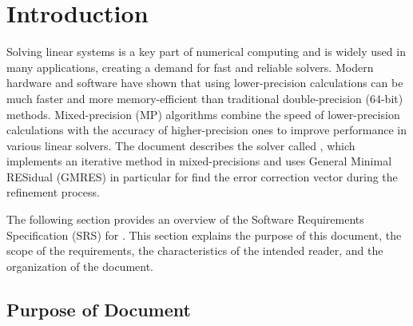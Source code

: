 \documentclass[12pt]{article}
\begin{document}





\section{Introduction}

Solving linear systems is a key part of numerical computing and is widely used
in many applications, creating a demand for fast and reliable solvers. Modern
hardware and software have shown that using lower-precision calculations can be
much faster and more memory-efficient than traditional double-precision (64-bit)
methods. Mixed-precision (MP) algorithms combine the speed of lower-precision
calculations with the accuracy of higher-precision ones to improve performance
in various linear solvers. The document describes the solver called \progname,
which implements an iterative method in mixed-precisions and uses General
Minimal RESidual (GMRES) in particular for find the error correction vector
during the refinement process.

The following section provides an overview of the Software Requirements
Specification (SRS) for \progname. This section explains the purpose of this
document, the scope of the requirements, the characteristics of the intended
reader, and the organization of the document.

\subsection{Purpose of Document}
\end{document}
